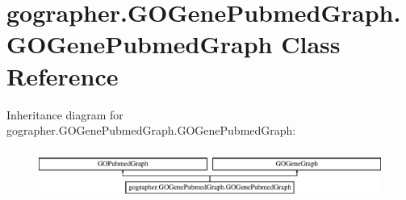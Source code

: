 \hypertarget{classgographer_1_1_g_o_gene_pubmed_graph_1_1_g_o_gene_pubmed_graph}{\section{gographer.\-G\-O\-Gene\-Pubmed\-Graph.\-G\-O\-Gene\-Pubmed\-Graph Class Reference}
\label{classgographer_1_1_g_o_gene_pubmed_graph_1_1_g_o_gene_pubmed_graph}
}
Inheritance diagram for gographer.\-G\-O\-Gene\-Pubmed\-Graph.\-G\-O\-Gene\-Pubmed\-Graph\-:\begin{figure}[H]
\begin{center}
\leavevmode
\includegraphics[height=1.623188cm]{classgographer_1_1_g_o_gene_pubmed_graph_1_1_g_o_gene_pubmed_graph}
\end{center}
\end{figure}
